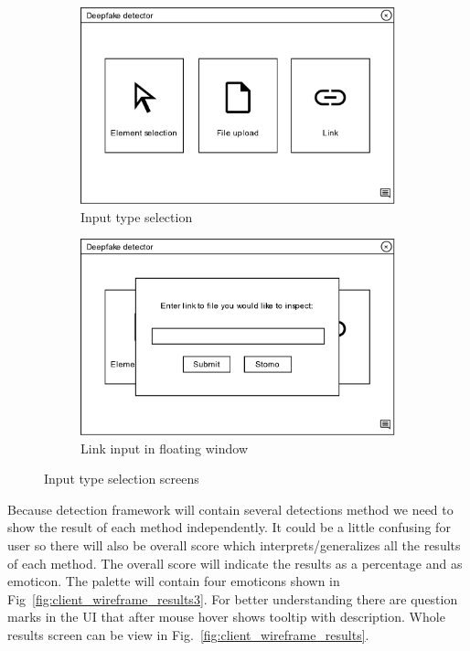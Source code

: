 \begin{figure}[H]
    \begin{subfigure}[h]{.5\linewidth}
        \centering
        \includegraphics[width=1\linewidth]{other-fig/client_wireframe_input_selection.png}
        \caption{Input type selection}
    \end{subfigure}
    \hfill
    \begin{subfigure}[h]{.475\linewidth}
        \centering
        \includegraphics[width=1\linewidth]{other-fig/client_wireframe_input_selection2.png}
        \caption{Link input in floating window}
    \end{subfigure}
    \caption{Input type selection screens}
    \label{fig:client_wireframe_input_selection}
\end{figure}

Because detection framework will contain several detections method we need to show the result of each method independently. It could be a little confusing for user so there will also be overall score which interprets/generalizes all the results of each method. The overall score will indicate the results as a percentage and as emoticon. The palette will contain four emoticons shown in Fig~\ref{fig:client_wireframe_results3}. For better understanding there are question marks in the UI that after mouse hover shows tooltip with description. Whole results screen can be view in Fig.~\ref{fig:client_wireframe_results}.

